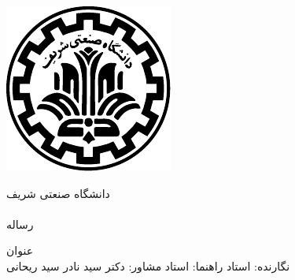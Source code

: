 \begin{center}
\thispagestyle{empty}
\includegraphics{Figs/logo} \\
\begin{Large}
دانشگاه صنعتی شریف \\
\fadepart \\ [1cm]
رساله  \falevel \\

\end{Large}
\vskip 1.5cm
\large{عنوان}  \\ \textbf{\large{\fatitle}}
\vskip 1cm
\large{نگارنده:}  \Large{\faAuthor}
\vskip 2cm
\large{استاد راهنما:}  \Large{\fasupervisor}
\vskip 1cm
\large{استاد مشاور:}  \Large{دکتر سید نادر سید ریحانی}
\vskip 2cm
\large{\fadate}
\end{center}

